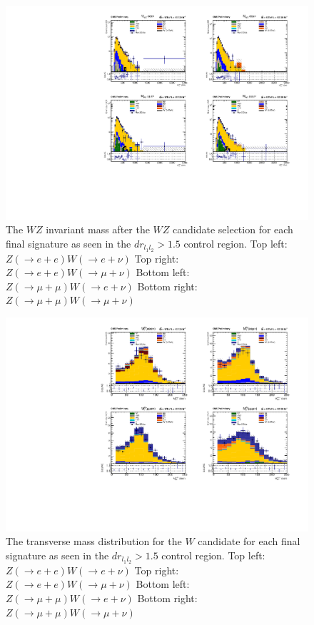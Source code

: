 \begin{figure}[tph]
  \centering
  \includegraphics[width=\textwidth]{fig/Run2/Rebining_HMassWZ_CR1_A_Run2_HRun2_M600.pdf}
  \caption{The $WZ$ invariant mass after the $WZ$ candidate selection for each final
    signature as seen in the $dr_{l_{1}l_{2}} > 1.5$ control region.
    Top left: $Z(\rightarrow e+e)W(\rightarrow e+\nu)$
    Top right: $Z(\rightarrow e+e)W(\rightarrow \mu+\nu)$
    Bottom left: $Z(\rightarrow \mu+\mu)W(\rightarrow e+\nu)$
    Bottom right: $Z(\rightarrow \mu+\mu)W(\rightarrow \mu+\nu)$}
  \label{fig:CR1_Run2_HMassWZ}
\end{figure}

\begin{figure}[tph]
  \centering
  \includegraphics[width=\textwidth]{fig/Run2/KFactorIncluded_HMassTW_CR1_A_Run2_HRun2_M600.pdf}
  \caption{The transverse mass distribution for the $W$ candidate for each final
    signature as seen in the $dr_{l_{1}l_{2}} > 1.5$ control region.
    Top left: $Z(\rightarrow e+e)W(\rightarrow e+\nu)$
    Top right: $Z(\rightarrow e+e)W(\rightarrow \mu+\nu)$
    Bottom left: $Z(\rightarrow \mu+\mu)W(\rightarrow e+\nu)$
    Bottom right: $Z(\rightarrow \mu+\mu)W(\rightarrow \mu+\nu)$}
  \label{fig:CR1_Run2_HMassTW}
\end{figure}

